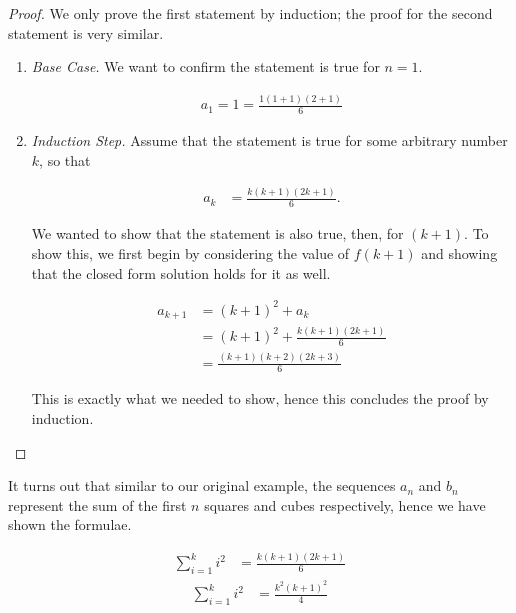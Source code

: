 \documentclass[twoside]{report}
\begin{document}
\begin{proof}
	We only prove the first statement by induction; the proof for the second statement is very similar.
	
	\vspace{\baselineskip}
	\begin{enumerate}
		\item \emph{Base Case.} We want to confirm the statement is true for $n = 1$.
		
		\begin{align*}
			a_1 = 1 = \frac{1 (1 + 1) (2 + 1)}{6}
		\end{align*}
		
		\item \emph{Induction Step.} Assume that the statement is true for some arbitrary number $k$, so that
		
		\begin{align*}
			a_k &= \frac{k(k + 1)(2k + 1)}{6}.
		\end{align*}
		
		We wanted to show that the statement is also true, then, for $(k + 1)$. To show this, we first begin by considering the value of $f(k + 1)$ and showing that the closed form solution holds for it as well.
				
		\begin{align*}
			a_{k + 1} &= (k + 1)^2 + a_k \\
			&= (k + 1)^2 + \frac{k(k + 1)(2k + 1)}{6} \\
			&= \frac{(k + 1)(k + 2)(2k + 3)}{6}
		\end{align*}
		
		This is exactly what we needed to show, hence this concludes the proof by induction.
	\end{enumerate}
\end{proof}
\vspace{\baselineskip}

It turns out that similar to our original example, the sequences $a_n$ and $b_n$ represent the sum of the first $n$ squares and cubes respectively, hence we have shown the formulae.

\begin{align}
	\sum_{i = 1}^k i^2 &= \frac{k(k + 1)(2k + 1)}{6}
\end{align}
\begin{align}
	\sum_{i = 1}^k i^2 &= \frac{k^2(k + 1)^2}{4}
\end{align}
\end{document}

